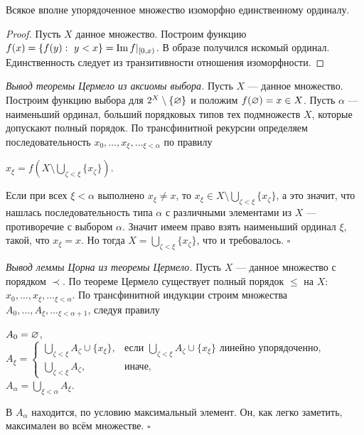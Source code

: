 \documentclass[10pt,a4paper]{article}%
\begin{document}
\begin{theorem}Всякое вполне упорядоченное множество изоморфно
единственному ординалу.
\end{theorem}

\begin{proof} Пусть $X$ данное множество. Построим функцию
$f(x)=\{f(y):~y<x\}=\operatorname{Im} f|_{[0,x)}$. В образе получился искомый
ординал. Единственность следует из транзитивности отношения
изоморфности.\end{proof}

\vskip 2pt{\em Вывод теоремы Цермело из аксиомы
выбора.} Пусть $X$
--- данное множество. Построим функцию выбора для
$2^{X}\setminus\{\varnothing\}$ и положим $f(\varnothing)=x\in X$. Пусть
$\alpha$ --- наименьший ординал, больший порядковых типов тех
подмножеств $X$, которые допускают полный порядок. По
трансфинитной рекурсии определяем последовательность
$x_0,\dots,x_{\xi},\dots_{\xi<\alpha}$ по правилу

\hfil$x_{\xi}=f(X\setminus\bigcup\limits_{\zeta<\xi}\{x_\zeta\})$.\hfil\par
Если при всех $\xi<\alpha$ выполнено $x_{\xi}\ne x$, то
$x_{\xi}\in X\setminus\bigcup\limits_{\zeta<\xi}\{x_\zeta\}$, а
это значит, что нашлась последовательность типа $\alpha$ с
различными элементами из $X$ --- противоречие с выбором $\alpha$.
Значит имеем право взять наименьший ординал $\xi$, такой, что
$x_{\xi}=x$. Но тогда $X=\bigcup\limits_{\zeta<\xi}\{x_{\zeta}\}$,
что и требовалось. $\square$

\vskip 2pt{\em Вывод леммы Цорна из теоремы
Цермело.} Пусть $X$
--- данное множество с порядком $\prec$. По теореме Цермело
существует полный порядок $\leqslant$ на $X$:
$x_0,\dots,x_{\xi},\dots_{\xi<\alpha}$. По трансфинитной индукции
строим множества $A_0,\dots,A_{\xi},\dots_{\xi<\alpha+1}$, следуя
правилу
\begin{center}$A_0=\varnothing$,\\
$A_{\xi}=\left\{
\begin{array}{ll}
\bigcup\limits_{\zeta<\xi}A_{\zeta}\cup\{x_{\xi}\}, & \mbox{если }
\bigcup\limits_{\zeta<\xi}A_{\zeta}\cup\{x_{\xi}\} \mbox{ линейно упорядоченно,}\\
\bigcup\limits_{\zeta<\xi}A_{\zeta}, & \mbox{иначе,}
\end{array}
\right.$ \\ $A_{\alpha}=\bigcup\limits_{\xi<\alpha}A_{\xi}$.
\end{center}
В $A_{\alpha}$ находится, по условию максимальный элемент. Он, как
легко заметить, максимален во всём множестве. $\square$
\end{document}
